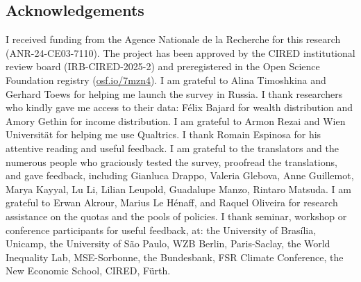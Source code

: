 \documentclass[12pt,english]{article}
\begin{document}
\begin{bibunit} %

\clearpage %
\section*{\normalsize Acknowledgements} %
I received funding from the Agence Nationale de la Recherche for this research (ANR-24-CE03-7110). %
The project has been approved by the CIRED institutional review board (IRB-CIRED-2025-2) and %
preregistered in the Open Science Foundation registry (\href{https://osf.io/7mzn4}{osf.io/7mzn4}). 
I am grateful to Alina Timoshkina and Gerhard Toews for helping me launch the survey in Russia. I thank researchers who kindly gave me access to their data: Félix Bajard for wealth distribution and Amory Gethin for income distribution. %
I am grateful to Armon Rezai and Wien Universität for helping me use Qualtrics. I thank Romain Espinosa for his attentive reading and useful feedback. I am grateful to the translators and the numerous people who graciously tested the survey, proofread the translations, and gave feedback, including Gianluca Drappo, Valeria Glebova, Anne Guillemot, Marya Kayyal, Lu Li, Lilian Leupold, Guadalupe Manzo, Rintaro Matsuda. %
I am grateful to Erwan Akrour, Marius Le Hénaff, and Raquel Oliveira %
for research assistance on the quotas and the pools of policies. I thank seminar, workshop or conference participants for useful feedback, at: the University of Brasília, Unicamp, the University of São Paulo, WZB Berlin, Paris-Saclay, the World Inequality Lab, MSE-Sorbonne, the Bundesbank, FSR Climate Conference, the New Economic School, CIRED, Fürth. 



\end{bibunit}
\end{document}
